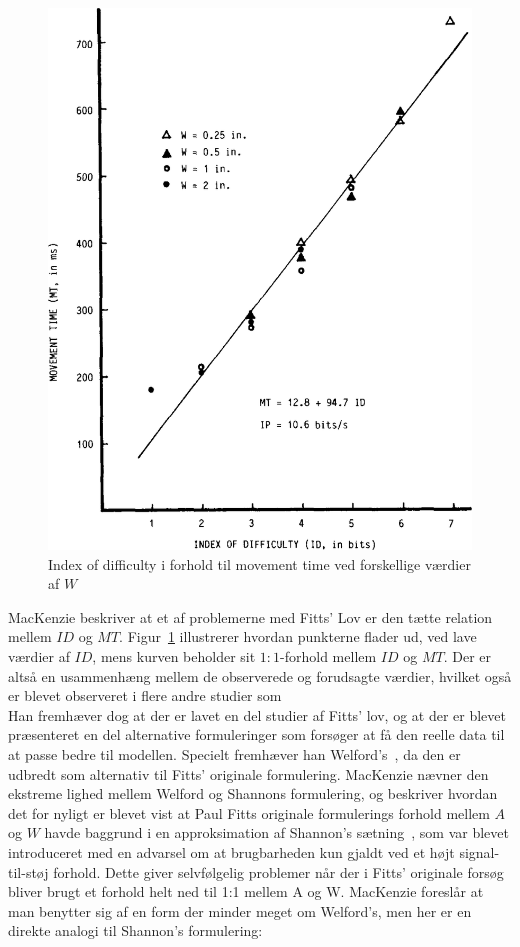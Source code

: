 \begin{figure}[h]
\centering
\includegraphics[scale=0.5]{images/illustrations/mackenzie_plot_1}
\caption{Index of difficulty i forhold til movement time ved forskellige værdier af $W$}
\label{fig:MacKenziePlot1}
\end{figure}
MacKenzie beskriver at et af problemerne med Fitts' Lov er den tætte relation mellem $ID$ og $MT$. Figur~\ref{fig:MacKenziePlot1} illustrerer hvordan punkterne flader ud, ved lave værdier af $ID$, mens kurven beholder sit $1:1$-forhold mellem $ID$ og $MT$. Der er altså en usammenhæng mellem de observerede og forudsagte værdier, hvilket også er blevet observeret i flere andre studier som \cite{welford1960, buck1986, crossman1983, drury1975, klapp1975, langolf1976, meyer1988, wallace1978}\\
Han fremhæver dog at der er lavet en del studier af Fitts' lov, og at der er blevet præsenteret en del alternative formuleringer som forsøger at få den reelle data til at passe bedre til modellen. Specielt fremhæver han Welford's~\cite{welford1960,welford1968}, da den er udbredt som alternativ til Fitts' originale formulering. MacKenzie nævner den ekstreme lighed mellem Welford og Shannons formulering, og beskriver hvordan det for nyligt er blevet vist at Paul Fitts originale formulerings forhold mellem $A$ og $W$ havde baggrund i en approksimation af Shannon's sætning~\cite[p. 388]{fitts1954}, som var blevet introduceret med en advarsel om at brugbarheden kun gjaldt ved et højt signal-til-støj forhold. Dette giver selvfølgelig problemer når der i Fitts' originale forsøg bliver brugt et forhold helt ned til 1:1 mellem A og W. MacKenzie foreslår at man benytter sig af en form der minder meget om Welford's, men her er en direkte analogi til Shannon's formulering:
